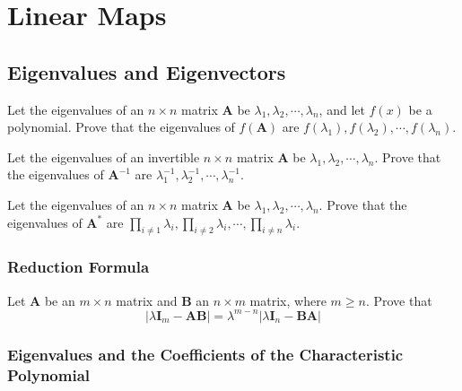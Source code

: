 \documentclass[12pt, a4paper, oneside]{book}
\begin{document}
\chapter{Linear Maps}
\section{Eigenvalues and Eigenvectors}

\begin{lemma}

\end{lemma}

\begin{theorem}
    Let the eigenvalues of an $n \times n$ matrix $\mathbf{A}$ be $\lambda_1, \lambda_2, \cdots, \lambda_n$, and let $f(x)$ be a polynomial. Prove that the eigenvalues of $f(\mathbf{A})$ are $f\left(\lambda_1\right), f\left(\lambda_2\right), \cdots, f\left(\lambda_n\right)$.
\end{theorem}
\begin{theorem}
    Let the eigenvalues of an invertible $n \times n$ matrix $\mathbf{A}$ be $\lambda_1, \lambda_2, \cdots, \lambda_n$. Prove that the eigenvalues of $\mathbf{A}^{-1}$ are $\lambda_1^{-1}, \lambda_2^{-1}, \cdots, \lambda_n^{-1}$.
\end{theorem}

\begin{theorem}
    Let the eigenvalues of an $n \times n$ matrix $\mathbf{A}$ be $\lambda_1, \lambda_2, \cdots, \lambda_n$. Prove that the eigenvalues of $\mathbf{A}^*$ are $\prod_{i \neq 1} \lambda_i, \prod_{i \neq 2} \lambda_i, \cdots, \prod_{i \neq n} \lambda_i$.
\end{theorem}

\subsection{Reduction Formula}
\begin{theorem}
    Let $\mathbf{A}$ be an $m \times n$ matrix and $\mathbf{B}$ an $n \times m$ matrix, where $m \geq n$. Prove that
    \[
        \left|\lambda \mathbf{I}_m-{\mathbf{A} \mathbf{B}}\right|=\lambda^{m-n}\left|\lambda \mathbf{I}_n-\mathbf{B} \mathbf{A}\right|
    \]
\end{theorem}


\subsection{Eigenvalues and the Coefficients of the Characteristic Polynomial}
\end{document}
